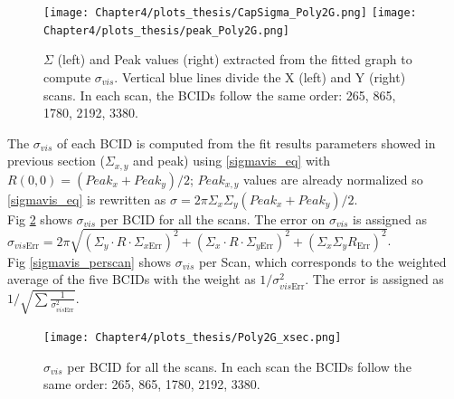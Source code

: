 \begin{center}
  \begin{figure}[ht]
    \centering
    \texttt{[image: Chapter4/plots\_thesis/CapSigma\_Poly2G.png]}
    \texttt{[image: Chapter4/plots\_thesis/peak\_Poly2G.png]}
    \caption[$\Sigma$ and peak values for all scan pairs]{$\Sigma$ (left) and Peak values (right) extracted from the fitted graph to compute $\sigma_{vis}$.  Vertical blue lines divide the X (left) and Y (right) scans. In each scan, the BCIDs follow the same order: 265, 865, 1780, 2192, 3380.} %
    \label{capsigma_peak}
  \end{figure}
\end{center}
The $\sigma_{vis}$ of each BCID is computed from the fit results parameters showed in previous section ($\Sigma_{x,y}$ and peak) using \ref{sigmavis_eq} with  $R(0,0)=(Peak_{x}+Peak_{y})/2$; $Peak_{x,y}$ values are already normalized so \ref{sigmavis_eq} is rewritten as $\sigma= 2\pi \Sigma_{x} \Sigma_{y} (Peak_{x}+Peak_{y})/2$.\\
Fig \ref{sigmavis_perbcid} shows  $\sigma_{vis}$ per BCID for all the scans. The error on $\sigma_{vis}$ is assigned as $\sigma_{vis\text{Err}}= 2 \pi \sqrt{ (\Sigma_{y} \cdot R \cdot \Sigma_{x\text{Err}})^{2} + (\Sigma_{x} \cdot R \cdot \Sigma_{y \text{Err}})^{2} + (\Sigma_{x} \Sigma_{y} R_{\text{Err}})^{2} }$.\\ %
Fig \ref{sigmavis_perscan} shows $\sigma_{vis}$ per Scan, which corresponds to the weighted average of the five BCIDs with the weight as $1/\sigma_{vis\text{Err}}^{2}$. The error is assigned as $1/\sqrt{\sum \frac{1}{\sigma_{vis\text{Err}}^{2}}}$.\\

  

\begin{center}
  \begin{figure}[ht]
    \centering
    \texttt{[image: Chapter4/plots\_thesis/Poly2G\_xsec.png]}
    \caption[$\sigma_{vis}$ per BCID for all scans]{ $\sigma_{vis}$ per BCID for all the scans.  In each scan the BCIDs follow the same order: 265, 865, 1780, 2192, 3380.} %
    \label{sigmavis_perbcid}
  \end{figure}
\end{center}

